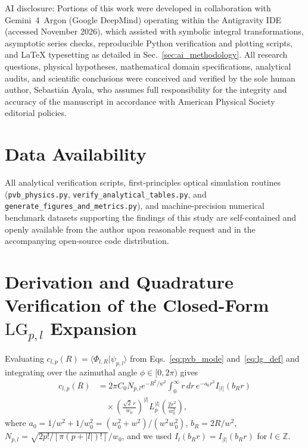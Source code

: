 \documentclass[aps,pra,onecolumn,notitlepage,11pt,tightenlines,amsmath,amssymb,floatfix,longbibliography]{revtex4-2}
\providecommand{\braket}[2]{\langle#1\vert#2\rangle}
\providecommand{\abs}[1]{\lvert#1\rvert}
\begin{document}
\begin{acknowledgments}
AI disclosure: Portions of this work were developed in collaboration with Gemini~4~Argon (Google DeepMind) operating within the Antigravity IDE (accessed November 2026), which assisted with symbolic integral transformations, asymptotic series checks, reproducible Python verification and plotting scripts, and \LaTeX{} typesetting as detailed in Sec.~\ref{sec:ai_methodology}. All research questions, physical hypotheses, mathematical domain specifications, analytical audits, and scientific conclusions were conceived and verified by the sole human author, Sebasti\'an Ayala, who assumes full responsibility for the integrity and accuracy of the manuscript in accordance with American Physical Society editorial policies.
\end{acknowledgments}

\section*{Data Availability}
All analytical verification scripts, first-principles optical simulation routines (\texttt{pvb\_\allowbreak physics.py}, \texttt{verify\_\allowbreak analytical\_\allowbreak tables.py}, and \texttt{generate\_\allowbreak figures\_\allowbreak and\_\allowbreak metrics.py}), and machine-precision numerical benchmark datasets supporting the findings of this study are self-contained and openly available from the author upon reasonable request and in the accompanying open-source code distribution.

\appendix
\section{Derivation and Quadrature Verification of the Closed-Form \texorpdfstring{$\mathrm{LG}_{p,l}$}{LG\_\{p,l\}} Expansion}
\label{app:lg_expansion}

Evaluating $c_{l,p}(R) = \braket{\Phi_{l,R}}{\psi_{p,l}}$ from Eqs.~\eqref{eq:pvb_mode} and~\eqref{eq:lg_def} and integrating over the azimuthal angle $\phi \in [0,2\pi)$ gives
\begin{align}
c_{l,p}(R) &= 2\pi C_0 N_{p,l} e^{-R^2/w^2} \int_0^\infty r\,dr\, e^{-a_0 r^2} I_{\abs{l}}(b_R r) \nonumber \\
&\quad \times \left(\frac{\sqrt{2}\,r}{w_0}\right)^{\abs{l}} L_p^{\abs{l}}\!\left(\frac{2r^2}{w_0^2}\right),
\label{eq:app_c_int}
\end{align}
where $a_0 = 1/w^2 + 1/w_0^2 = (w_0^2+w^2)/(w^2 w_0^2)$, $b_R = 2R/w^2$, $N_{p,l} = \sqrt{2p!/[\pi(p+\abs{l})!]}/w_0$, and we used $I_l(b_R r) = I_{\abs{l}}(b_R r)$ for $l \in \mathbb{Z}$.
\end{document}
